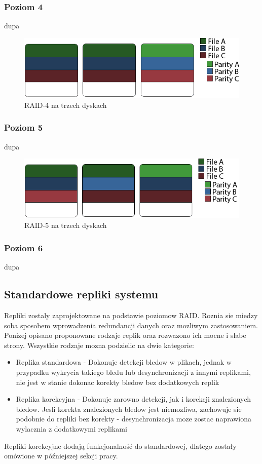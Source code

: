 \subsubsection{Poziom 4}
dupa
\begin{figure}[h!]
        \centering
        \includegraphics{raid-4.png}
        \caption{RAID-4 na trzech dyskach}
        \label{fig:raid4}
\end{figure}
\subsubsection{Poziom 5}
dupa
\begin{figure}[h!]
        \centering
        \includegraphics{raid-5.png}
        \caption{RAID-5 na trzech dyskach}
        \label{fig:raid5}
\end{figure}
\subsubsection{Poziom 6}
dupa

\newpage
\subsection{Standardowe repliki systemu}
Repliki zostaly zaprojektowane na podstawie poziomow RAID. Roznia sie miedzy soba sposobem wprowadzenia redundancji danych oraz mozliwym zastosowaniem. Ponizej opisano proponowane rodzaje replik oraz rozwazono ich mocne i slabe strony. Wszystkie rodzaje mozna podzielic na dwie kategorie:
\begin{itemize}
    \item Replika standardowa - Dokonuje detekcji bledow w plikach, jednak w przypadku wykrycia takiego bledu lub desynchronizacji z innymi replikami, nie jest w stanie dokonac korekty bledow bez dodatkowych replik
    \item Replika korekcyjna - Dokonuje zarowno detekcji, jak i korekcji znalezionych bledow. Jesli korekta znalezionych bledow jest niemozliwa, zachowuje sie podobnie do repliki bez korekty - desynchronizacja moze zostac naprawiona wylacznia z dodatkowymi replikami
\end{itemize}
Repliki korekcyjne dodają funkcjonalność do standardowej, dlatego zostały omówione w późniejszej sekcji pracy. 

